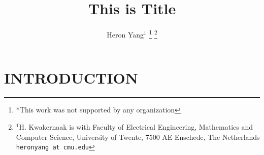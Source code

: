 \documentclass[letterpaper, 10 pt, conference]{ieeeconf}
\title{\LARGE \bf
    This is Title
}
\author{Heron Yang$^{1}$
    \thanks{*This work was not supported by any organization}%
    \thanks{$^{1}$H. Kwakernaak is with Faculty of Electrical Engineering, Mathematics and Computer Science, University of Twente, 7500 AE Enschede, The Netherlands
    {\tt\small heronyang at cmu.edu}}%
}
\begin{document}
\maketitle
\thispagestyle{empty}
\pagestyle{empty}

\begin{abstract}

\end{abstract}

\section{INTRODUCTION}

\cite{briggs1925design}

\printbibliography
\end{document}
